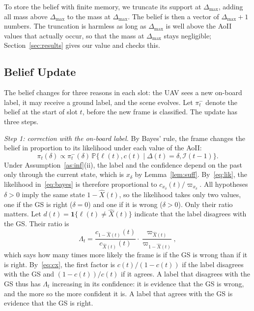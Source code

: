 \documentclass[5p,twocolumn]{elsarticle}
\theoremstyle{remark}
\newcommand{\Prob}{\mathbb{P}}
\newcommand{\ind}[1]{\mathbf{1}\{#1\}}
\newcommand{\I}{\mathcal{I}}
\newcommand{\lab}{\ell}
\begin{document}
To store the belief with finite memory, we truncate its support at $\Delta_{\max}$, adding all mass above $\Delta_{\max}$ to the mass at $\Delta_{\max}$. The belief is then a vector of $\Delta_{\max}+1$ numbers. The truncation is harmless as long as $\Delta_{\max}$ is well above the AoII values that actually occur, so that the mass at $\Delta_{\max}$ stays negligible; Section~\ref{sec:results} gives our value and checks this.

\subsection{Belief Update}\label{sec:update}
The belief changes for three reasons in each slot: the UAV sees a new on-board label, it may receive a ground label, and the scene evolves. Let $\pi^-_t$ denote the belief at the start of slot $t$, before the new frame is classified. The update has three steps.

\emph{Step 1: correction with the on-board label.} By Bayes' rule, the frame changes the belief in proportion to its likelihood under each value of the AoII:
\begin{equation}\label{eq:bayes}
\pi_t(\delta)\propto\pi^-_t(\delta)\,\Prob\big\{\lab(t),c(t)\mid\Delta(t)=\delta,\I(t-1)\big\}.
\end{equation}
Under Assumption~\ref{as:inf}(ii), the label and the confidence depend on the past only through the current state, which is $x_\delta$ by Lemma~\ref{lem:suff}. By~\eqref{eq:lik}, the likelihood in~\eqref{eq:bayes} is therefore proportional to $c_{x_\delta}(t)/\varpi_{x_\delta}$. All hypotheses $\delta>0$ imply the same state $1-\hat X(t)$, so the likelihood takes only two values, one if the GS is right ($\delta=0$) and one if it is wrong ($\delta>0$). Only their ratio matters. Let $d(t)=\ind{\lab(t)\neq\hat X(t)}$ indicate that the label disagrees with the GS. Their ratio is
\begin{equation}\label{eq:Lambda}
\Lambda_t=\frac{c_{1-\hat X(t)}(t)}{c_{\hat X(t)}(t)}\cdot\frac{\varpi_{\hat X(t)}}{\varpi_{1-\hat X(t)}},
\end{equation}
which says how many times more likely the frame is if the GS is wrong than if it is right. By~\eqref{eq:cx}, the first factor is $c(t)/(1-c(t))$ if the label disagrees with the GS and $(1-c(t))/c(t)$ if it agrees. A label that disagrees with the GS thus has $\Lambda_t$ increasing in its confidence: it is evidence that the GS is wrong, and the more so the more confident it is. A label that agrees with the GS is evidence that the GS is right.
\end{document}
